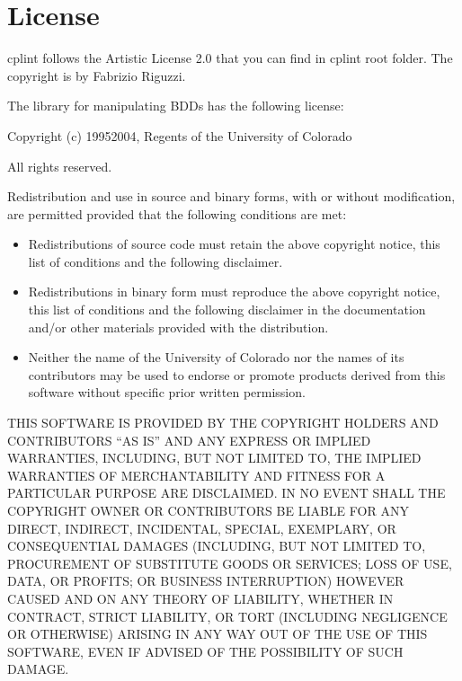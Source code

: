 \documentclass[letterpaper,10pt,english]{sphinxmanual}
\begin{document}
\chapter{License}
\label{\detokenize{index:license}}
\sphinxAtStartPar
cplint follows the Artistic License 2.0 that you can find in cplint root folder.
The copyright is by Fabrizio Riguzzi.

\sphinxAtStartPar
The library  for manipulating BDDs has the following license:

\sphinxAtStartPar
Copyright (c) 1995\sphinxhyphen{}2004, Regents of the University of Colorado

\sphinxAtStartPar
All rights reserved.

\sphinxAtStartPar
Redistribution and use in source and binary forms, with or without
modification, are permitted provided that the following conditions
are met:
\begin{itemize}
\item {} 
\sphinxAtStartPar
Redistributions of source code must retain the above copyright notice, this list of conditions and the following disclaimer.

\item {} 
\sphinxAtStartPar
Redistributions in binary form must reproduce the above copyright notice, this list of conditions and the following disclaimer in the documentation and/or other materials provided with the distribution.

\item {} 
\sphinxAtStartPar
Neither the name of the University of Colorado nor the names of its contributors may be used to endorse or promote products derived from this software without specific prior written permission.

\end{itemize}

\sphinxAtStartPar
THIS SOFTWARE IS PROVIDED BY THE COPYRIGHT HOLDERS AND CONTRIBUTORS
“AS IS” AND ANY EXPRESS OR IMPLIED WARRAN\sphinxhyphen{}TIES, INCLUDING, BUT NOT
LIMITED TO, THE IMPLIED WARRANTIES OF MERCHANTABILITY AND FITNESS
FOR A PARTICULAR PURPOSE ARE DISCLAIMED. IN NO EVENT SHALL THE
COPYRIGHT OWNER OR CONTRIBUTORS BE LIABLE FOR ANY DIRECT, INDIRECT,
INCIDENTAL, SPECIAL, EXEMPLARY, OR CONSEQUENTIAL DAMAGES (INCLUDING,
BUT NOT LIMITED TO, PROCUREMENT OF SUBSTITUTE GOODS OR SERVICES;
LOSS OF USE, DATA, OR PROFITS; OR BUSINESS INTERRUPTION) HOWEVER
CAUSED
AND ON ANY THEORY OF LIABILITY, WHETHER IN CONTRACT, STRICT
LIABILITY, OR TORT (INCLUDING NEGLIGENCE OR OTHERWISE) ARISING IN
ANY WAY OUT OF THE USE OF THIS SOFTWARE, EVEN IF ADVISED OF THE
POSSIBILITY OF SUCH DAMAGE.
\end{document}
